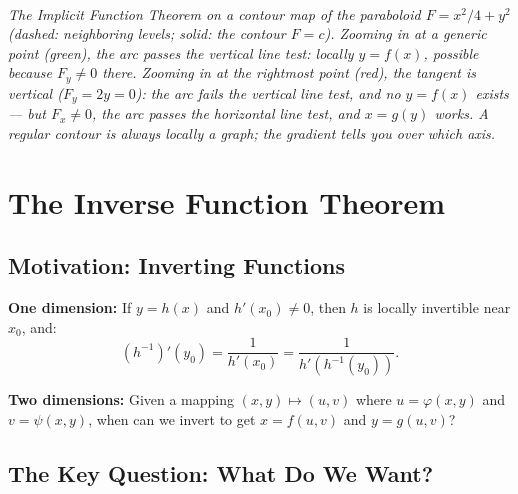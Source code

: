 \documentclass[11pt]{report}
\newcommand{\figcap}[1]{\\[1.5mm]\parbox{0.92\textwidth}{\small\itshape #1}}
\begin{document}
\begin{center}
%
\figcap{The Implicit Function Theorem on a contour map of the paraboloid $F = x^2/4 + y^2$ (dashed: neighboring levels; solid: the contour $F = c$). Zooming in at a generic point (green), the arc passes the vertical line test: locally $y = f(x)$, possible because $F_y \neq 0$ there. Zooming in at the rightmost point (red), the tangent is vertical ($F_y = 2y = 0$): the arc fails the vertical line test, and no $y = f(x)$ exists --- but $F_x \neq 0$, the arc passes the \textnormal{horizontal} line test, and $x = g(y)$ works. A regular contour is always locally a graph; the gradient tells you over which axis.}
\end{center}

\section{The Inverse Function Theorem}

\subsection*{Motivation: Inverting Functions}

\textbf{One dimension:} If $y = h(x)$ and $h'(x_0) \neq 0$, then $h$ is locally invertible near $x_0$, and:
\[
(h^{-1})'(y_0) = \frac{1}{h'(x_0)} = \frac{1}{h'(h^{-1}(y_0))}.
\]

\textbf{Two dimensions:} Given a mapping $(x, y) \mapsto (u, v)$ where $u = \varphi(x, y)$ and $v = \psi(x, y)$, when can we invert to get $x = f(u, v)$ and $y = g(u, v)$?

\subsection*{The Key Question: What Do We Want?}
\end{document}

